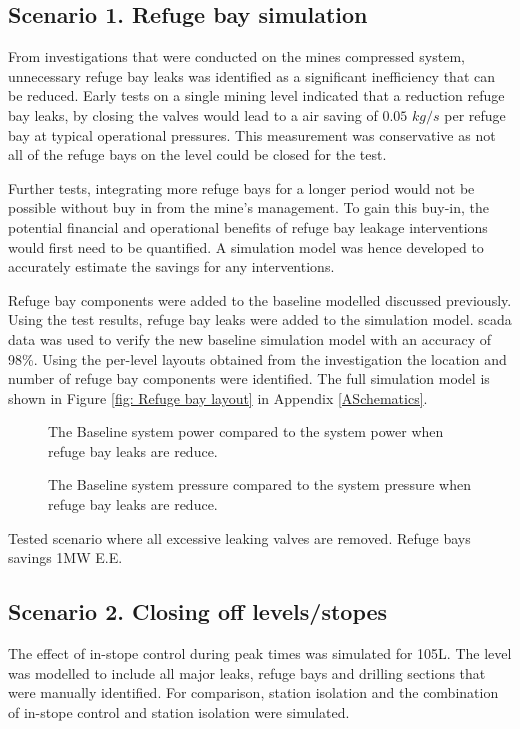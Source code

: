 	\subsection{Scenario 1. Refuge bay simulation}
	From investigations that were conducted on the mines compressed system, unnecessary refuge bay leaks was identified as a significant inefficiency that can be reduced. Early tests on a single mining level indicated that a reduction refuge bay leaks, by closing the valves would lead to a air saving of $0.05$ $kg/s$ per refuge bay at typical operational pressures. This measurement was conservative as not all of the refuge bays on the level could be closed for the test.
	\par 
	Further tests, integrating more refuge bays for a longer period would not be possible without buy in from the mine's management. To gain this buy-in, the potential financial and operational benefits of refuge bay leakage interventions would first need to be quantified. A simulation model was hence developed to accurately estimate the savings for any interventions.
	\par
	Refuge bay components were added to the baseline modelled discussed previously. Using the test results, refuge bay leaks were added to the simulation model. \gls{scada} data was used to verify the new baseline simulation model with an accuracy of 98\%. Using the per-level layouts obtained from the investigation the location and number of refuge bay components were identified. The full simulation model is shown in Figure \ref{fig: Refuge bay layout} in Appendix \ref{ASchematics}.
	\par 
	
	\begin{figure}[h]
		\centering
		\fbox{}
		\caption{The Baseline system power compared to the system power when refuge bay leaks are reduce.}
		\label{fig: RefugeBay Power.}
	\end{figure}   

	\begin{figure}[h]
		\centering
		\fbox{}
		\caption{The Baseline system pressure compared to the system pressure when refuge bay leaks are reduce.}
		\label{fig: RefugeBay Pressures.}
	\end{figure}  
	Tested scenario where all excessive leaking valves are removed.
	Refuge bays savings 1MW E.E.
	
	\subsection{Scenario 2. Closing off levels/stopes}
	The effect of in-stope control during peak times was simulated for 105L. The level was modelled to include all major leaks, refuge bays and drilling sections that were manually identified. For comparison, station isolation and the combination of in-stope control and station isolation were simulated. 
	
